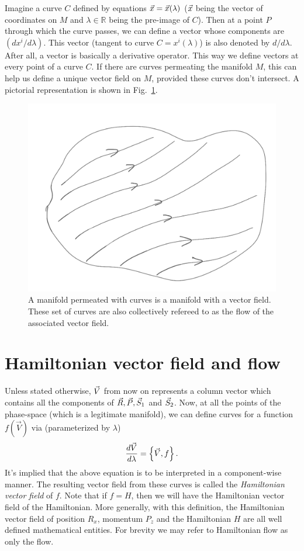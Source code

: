 Imagine a curve $C$ defined by equations 
$\vec{x} = \vec{x}(\lambda)$ ($\vec{x}$ being the vector
of coordinates on $M$ and $\lambda  \in  \mathbb{R} $
 being the pre-image of $C$). Then at a point $P$ through which 
 the curve passes, we can 
define a vector whose components are $(dx^i/d \lambda)$. 
This vector (tangent to curve $C = x^i(\lambda)$)
is also denoted by $d/d \lambda$. After all,
 a vector is basically  a derivative operator.
This way we define vectors at every point of a curve $C$. If there are curves permeating
the manifold $M$, this can help us define a unique vector field on $M$, provided 
these curves don't intersect. A pictorial representation is shown in 
Fig.~\ref{vector_field}.




\begin{figure}
   \centering
  \includegraphics[width=0.4\linewidth]{vector_field}
  \caption{A manifold permeated with curves is a manifold with a vector field.
  These set of curves are also collectively refereed to as the flow of the
  associated vector field.
    \vspace{-1.em}
  }
  \label{vector_field}
\end{figure}


\section{Hamiltonian vector field and flow}

Unless stated otherwise, $\vec{V}$ from now on represents a column vector 
which contains all the components of $\vec{R}, \vec{P}, \vec{S}_1$ and $\vec{S}_2$.
Now, at all the points of the phase-space (which is a legitimate manifold),
we can define curves for a function $f(\vec{V})$ via (parameterized by $\lambda$)
\begin{align}
\frac{d \vec{V}}{d \lambda}   =  \left\lbrace \vec{V},  f \right\rbrace  .       \label{H-flow}
\end{align}
It's implied that the above equation is to
 be interpreted in a component-wise manner.
The resulting vector field from these curves is called the 
\textit{Hamiltonian vector field} of $f$. Note that if $f = H$, then we will
have the Hamiltonian vector field of the 
Hamiltonian. More generally, with this definition, 
the Hamiltonian vector field of position 
$R_x$, momentum $P_z$ and the Hamiltonian $H$
are all well defined mathematical entities. 
For brevity we may refer to 
Hamiltonian flow as only the flow.


